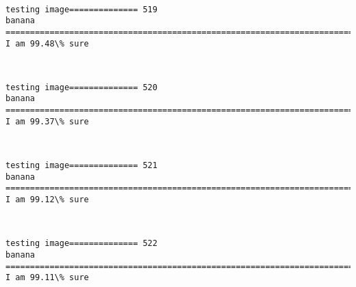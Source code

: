 \documentclass[11pt]{article}
\begin{document}
    \begin{center}
    \end{center}
    { \hspace*{\fill} \\}
    
    \begin{Verbatim}[commandchars=\\\{\}]
testing image============== 519
banana
============================================================================
I am 99.48\% sure

    \end{Verbatim}

    \begin{center}
    \end{center}
    { \hspace*{\fill} \\}
    
    \begin{Verbatim}[commandchars=\\\{\}]
testing image============== 520
banana
============================================================================
I am 99.37\% sure

    \end{Verbatim}

    \begin{center}
    \end{center}
    { \hspace*{\fill} \\}
    
    \begin{Verbatim}[commandchars=\\\{\}]
testing image============== 521
banana
============================================================================
I am 99.12\% sure

    \end{Verbatim}

    \begin{center}
    \end{center}
    { \hspace*{\fill} \\}
    
    \begin{Verbatim}[commandchars=\\\{\}]
testing image============== 522
banana
============================================================================
I am 99.11\% sure

    \end{Verbatim}
\end{document}
